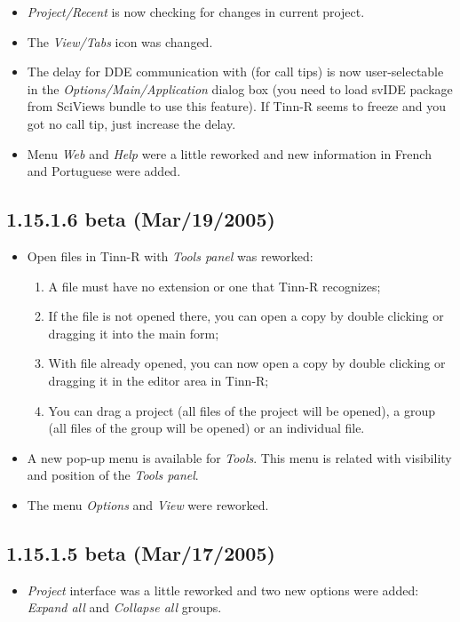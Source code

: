 \begin{itemize}
  \item \textit{Project/Recent} is now checking for changes in current project.
  \item The \textit{View/Tabs} icon was changed.
  \item The delay for DDE communication with \RR{} (for call tips) is now user-selectable in the
    \textit{Options/Main/Application} dialog box (you need to load svIDE package from SciViews bundle to use this feature).
    If Tinn-R seems to freeze and you got no call tip, just increase the delay.
  \item Menu \textit{Web} and \textit{Help} were a little reworked and new information in French and Portuguese were added.
\end{itemize}


\subsection*{1.15.1.6 beta (Mar/19/2005)}
\begin{itemize}
  \item Open files in Tinn-R with \textit{Tools panel} was reworked:
    \begin{enumerate}
      \item A file must have no extension or one that Tinn-R recognizes;
      \item If the file is not opened there, you can open a copy by double clicking or dragging it into the main form;
      \item With file already opened, you can now open a copy by double clicking or dragging it in the editor area
        in Tinn-R;
      \item You can drag a project (all files of the project will be opened), a group (all files of the group will
        be opened) or an individual file.
    \end{enumerate}
  \item A new pop-up menu is available for \textit{Tools}. This menu is related with visibility and position
    of the \textit{Tools panel}.
  \item The menu \textit{Options} and \textit{View} were reworked.
\end{itemize}


\subsection*{1.15.1.5 beta (Mar/17/2005)}
\begin{itemize}
  \item \textit{Project} interface was a little reworked and two new
    options were added: \textit{Expand all}  and \textit{Collapse all}
    groups.
\end{itemize}


